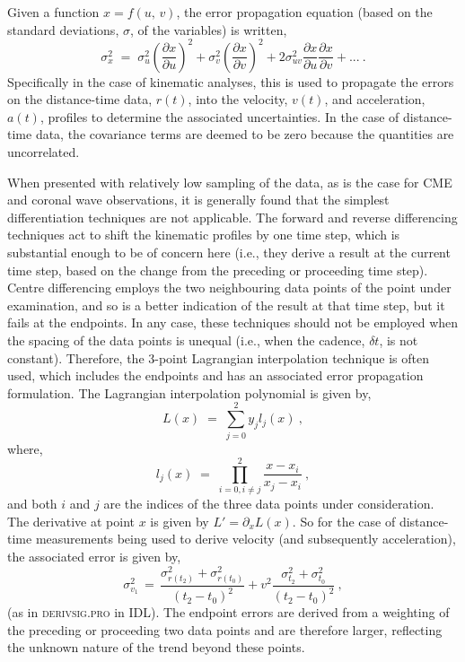 \documentclass[structabstract]{aa}
\begin{document}
Given a function $x=f(u,\,v)$, the error propagation equation (based on the standard deviations, $\sigma$, of the variables) is written,
\begin{equation}
\label{eqn_errorprop}
\sigma_x^2 \; = \; \sigma_u^2 \left(\frac{\partial x}{\partial u}\right) ^2 + \sigma_v^2 \left( \frac{\partial x}{\partial v} \right) ^2 + 2 \sigma_{uv}^2 \frac{\partial x}{\partial u} \frac{\partial x}{\partial v} + ...\ .
\end{equation}
Specifically in the case of kinematic analyses, this is used to propagate the errors on the distance-time data, $r(t)$, into the velocity, $v(t)$, and acceleration, $a(t)$, profiles to determine the associated uncertainties. In the case of distance-time data, the covariance terms are deemed to be zero because the quantities are uncorrelated.

When presented with relatively low sampling of the data, as is the case for CME and coronal wave observations, it is generally found that the simplest differentiation techniques are not applicable. The forward and reverse differencing techniques act to shift the kinematic profiles by one time step, which is substantial enough to be of concern here (i.e., they derive a result at the current time step, based on the change from the preceding or proceeding time step). Centre differencing employs the two neighbouring data points of the point under examination, and so is a better indication of the result at that time step, but it fails at the endpoints. In any case, these techniques should not be employed when the spacing of the data points is unequal (i.e., when the cadence, $\delta t$, is not constant). Therefore, the 3-point Lagrangian interpolation technique is often used, which includes the endpoints and has an associated error propagation formulation. The Lagrangian interpolation polynomial is given by,
\begin{equation}
L(x) \; =\; \sum_{j=0}^2 y_j l_j(x)\ ,
\end{equation}
where,
\begin{equation}
l_j(x) \; =\; \prod_{i=0, i\neq j}^2 \frac{x-x_i}{x_j-x_i} \ ,
\end{equation}
and both $i$ and $j$ are the indices of the three data points under consideration. The derivative at point $x$ is given by $L'=\partial_x L(x)$. So for the case of distance-time measurements being used to derive velocity (and subsequently acceleration), the associated error is given by,
\begin{equation}
\sigma_{v_1}^2 \,=\, \frac{\sigma_{r(t_2)}^2+\sigma_{r(t_0)}^2}{(t_2-t_0)^2} + v^2 \frac{\sigma_{t_2}^2+\sigma_{t_0}^2}{(t_2-t_0)^2}\ ,
\label{vel_err}
\end{equation}
(as in \textsc{derivsig.pro} in IDL). The endpoint errors are derived from a weighting of the preceding or proceeding two data points and are therefore larger, reflecting the unknown nature of the trend beyond these points.
\end{document}
